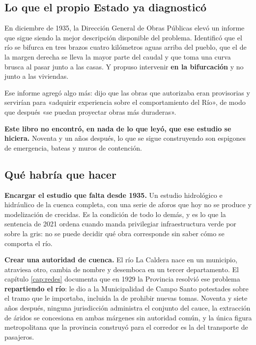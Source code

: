 \subsection*{Lo que el propio Estado ya diagnosticó}

En diciembre de 1935, la Dirección General de Obras Públicas elevó un informe que sigue
siendo la mejor descripción disponible del problema. Identificó que el río se bifurca en tres
brazos cuatro kilómetros aguas arriba del pueblo, que el de la margen derecha se lleva la
mayor parte del caudal y que toma una curva brusca al pasar junto a las casas. Y propuso
intervenir \textbf{en la bifurcación} y no junto a las viviendas.

Ese informe agregó algo más: dijo que las obras que autorizaba eran provisorias y servirían
para «adquirir experiencia sobre el comportamiento del Río», de modo que después «se puedan
proyectar obras más duraderas».

\textbf{Este libro no encontró, en nada de lo que leyó, que ese estudio se hiciera.} Noventa y un años después, lo que se sigue construyendo
son espigones de emergencia, bateas y muros de contención.

\subsection*{Qué habría que hacer}

\textbf{Encargar el estudio que falta desde 1935.} Un estudio hidrológico e hidráulico de la
cuenca completa, con una serie de aforos que hoy no se produce y modelización de crecidas. Es la
condición de todo lo demás, y es lo que la sentencia de 2021 ordena cuando manda privilegiar
infraestructura verde por sobre la gris: no se puede decidir qué obra corresponde sin saber
cómo se comporta el río.

\textbf{Crear una autoridad de cuenca.} El río La Caldera nace en un municipio, atraviesa
otro, cambia de nombre y desemboca en un tercer departamento. El capítulo \ref{cap:redes} documenta que en
1929 la Provincia resolvió ese problema \textbf{repartiendo el río}: le dio a la
Municipalidad de Campo Santo potestades sobre el tramo que le importaba, incluida la de
prohibir nuevas tomas. Noventa y siete años después, ninguna jurisdicción administra el
conjunto del cauce, la extracción de áridos se concesiona en ambas márgenes sin autoridad
común, y la única figura metropolitana que la provincia construyó para el corredor es la del
transporte de pasajeros.

